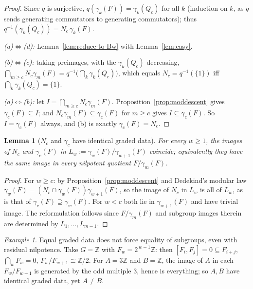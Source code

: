 \documentclass{amsart}
\newtheorem{lemma}{Lemma}
\theoremstyle{definition}
\theoremstyle{remark}
\newtheorem{example}{Example}
\begin{document}
\begin{proof}
Since $q$ is surjective, $q(\gamma_k(F))=\gamma_k(Q_c)$ for all $k$ (induction on
$k$, as $q$ sends generating commutators to generating commutators); thus
$q^{-1}(\gamma_k(Q_c))=N_c\,\gamma_k(F)$.

\emph{(a)$\Leftrightarrow$(d):} Lemma~\ref{lem:reduce-to-Bw} with
Lemma~\ref{lem:easy}.

\emph{(b)$\Leftrightarrow$(c):} taking preimages, with the $\gamma_k(Q_c)$
decreasing,
$\bigcap_{m\ge c} N_c\gamma_m(F)=q^{-1}\!\big(\bigcap_k\gamma_k(Q_c)\big)$, which
equals $N_c=q^{-1}(\{1\})$ iff $\bigcap_k\gamma_k(Q_c)=\{1\}$.

\emph{(a)$\Leftrightarrow$(b):} let $I=\bigcap_{m\ge c}N_c\gamma_m(F)$.
Proposition~\ref{prop:moddescent} gives $\gamma_c(F)\subseteq I$; and
$N_c\gamma_m(F)\subseteq\gamma_c(F)$ for $m\ge c$ gives $I\subseteq\gamma_c(F)$. So
$I=\gamma_c(F)$ always, and (b) is exactly $\gamma_c(F)=N_c$.
\end{proof}

\begin{lemma}[$N_c$ and $\gamma_c$ have identical graded data]\label{lem:gradedNc}
For every $w\ge1$, the images of $N_c$ and $\gamma_c(F)$ in
$L_w:=\gamma_w(F)/\gamma_{w+1}(F)$ coincide; equivalently they have the same image
in every nilpotent quotient $F/\gamma_m(F)$.
\end{lemma}

\begin{proof}
For $w\ge c$: by Proposition~\ref{prop:moddescent} and Dedekind's modular law
$\gamma_w(F)=(N_c\cap\gamma_w(F))\gamma_{w+1}(F)$, so the image of $N_c$ in $L_w$ is
all of $L_w$, as is that of $\gamma_c(F)\supseteq\gamma_w(F)$. For $w<c$ both lie in
$\gamma_{w+1}(F)$ and have trivial image. The reformulation follows since
$F/\gamma_m(F)$ and subgroup images therein are determined by $L_1,\dots,L_{m-1}$.
\end{proof}

\begin{example}\label{ex:Z}
Equal graded data does not force equality of subgroups, even with residual
nilpotence. Take $G=\mathbb Z$ with $F_w=2^{\,w-1}\mathbb Z$: then
$[F_i,F_j]=0\subseteq F_{i+j}$, $\bigcap_w F_w=0$, $F_w/F_{w+1}\cong\mathbb Z/2$.
For $A=3\mathbb Z$ and $B=\mathbb Z$, the image of $A$ in each $F_w/F_{w+1}$ is
generated by the odd multiple $3$, hence is everything; so $A,B$ have identical
graded data, yet $A\ne B$.
\end{example}
\end{document}
